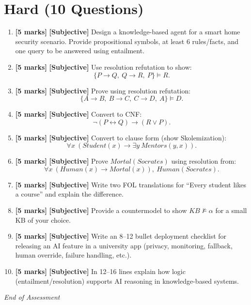 \documentclass[11pt,a4paper]{article}
\newcommand{\HMarks}{\textbf{[5 marks]} }
\begin{document}
\section*{Hard (10 Questions)}
\begin{enumerate}[label=\textbf{H\arabic*.}, leftmargin=*]
  \item \HMarks \textbf{[Subjective]} Design a knowledge-based agent for a smart home security scenario.
    Provide propositional symbols, at least 6 rules/facts, and one query to be answered using entailment.

  \item \HMarks \textbf{[Subjective]} Use resolution refutation to show:
    \[
      \{P \rightarrow Q,\ Q \rightarrow R,\ P\} \models R.
    \]

  \item \HMarks \textbf{[Subjective]} Prove using resolution refutation:
    \[
      \{A \rightarrow B,\ B \rightarrow C,\ C \rightarrow D,\ A\} \models D.
    \]

  \item \HMarks \textbf{[Subjective]} Convert to CNF:
    \[
      \lnot(P \leftrightarrow Q) \rightarrow (R \lor P).
    \]

  \item \HMarks \textbf{[Subjective]} Convert to clause form (show Skolemization):
    \[
      \forall x\ (Student(x) \rightarrow \exists y\ Mentors(y,x)).
    \]

  \item \HMarks \textbf{[Subjective]} Prove $Mortal(Socrates)$ using resolution from:
    \[
      \forall x\ (Human(x) \rightarrow Mortal(x)),\ Human(Socrates).
    \]

  \item \HMarks \textbf{[Subjective]} Write two FOL translations for ``Every student likes a course'' and explain the difference.

  \item \HMarks \textbf{[Subjective]} Provide a countermodel to show $KB \not\models \alpha$ for a small KB of your choice.

  \item \HMarks \textbf{[Subjective]} Write an 8--12 bullet deployment checklist for releasing an AI feature in a university app
    (privacy, monitoring, fallback, human override, failure handling, etc.).

  \item \HMarks \textbf{[Subjective]} In 12--16 lines explain how logic (entailment/resolution) supports AI reasoning in knowledge-based systems.
\end{enumerate}

\vfill
\noindent\textit{End of Assessment}
\end{document}
